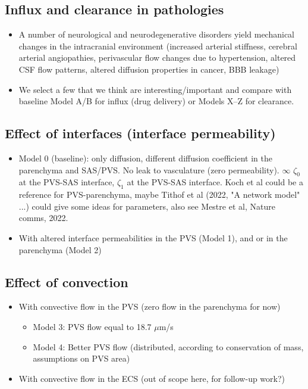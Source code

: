 \documentclass[fleqn,10pt]{wlscirep}
\newcommand{\draft}[1]{\textcolor{gray}{#1}}
\begin{document}
\subsection*{Influx and clearance in pathologies}

\begin{itemize}
\item
  A number of neurological and neurodegenerative disorders yield mechanical changes in the intracranial environment (increased arterial stiffness, cerebral arterial angiopathies, perivascular flow changes due to hypertension, altered CSF flow patterns, altered diffusion properties in cancer, BBB leakage) 
\item
  We select a few that we think are interesting/important and compare with baseline Model A/B for influx (drug delivery) or Models X--Z for clearance.
\end{itemize}

\draft{\lipsum[1]}



\iffalse
\newpage
\subsection*{Effect of interfaces (interface permeability)}

\begin{itemize}
    \item Model 0 (baseline): only diffusion, different diffusion coefficient in the parenchyma and SAS/PVS. No leak to vasculature (zero permeability). $\infty$ $\zeta_0$ at the PVS-SAS interface, $\zeta_1$ at the PVS-SAS interface. Koch et al could be a reference for PVS-parenchyma, maybe Tithof et al (2022, "A network model" ...) could give some ideas for parameters, also see Mestre et al, Nature comms, 2022. 
    \item 
    With altered interface permeabilities in the PVS (Model 1), and or in the parenchyma (Model 2) 
    \end{itemize}

\begin{figure}
    \caption{}
    \label{fig:1}
\end{figure}

\subsection*{Effect of convection}
\begin{itemize}
    \item 
    With convective flow in the PVS (zero flow in the parenchyma for now)
    \begin{itemize}
        \item 
        Model 3: PVS flow equal to 18.7 $\mu$m/s
        \item 
        Model 4: Better PVS flow (distributed, according to conservation of mass, assumptions on PVS area)
    \end{itemize}    
    \item 
    With convective flow in the ECS (out of scope here, for follow-up work?)
\end{itemize}
\end{document}
